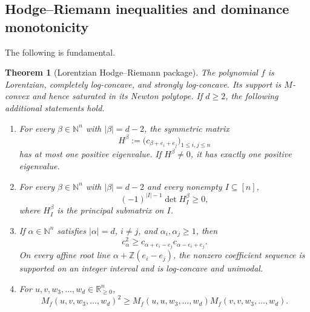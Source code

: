 \documentclass[11pt,a4paper,oneside]{amsart}
\numberwithin{equation}{section}
\newtheorem{theorem}{Theorem}[section]
\theoremstyle{definition}
\theoremstyle{remark}
\newcommand{\N}{\mathbb N}
\newcommand{\Z}{\mathbb Z}
\newcommand{\R}{\mathbb R}
\newcommand{\abs}[1]{\lvert#1\rvert}
\begin{document}
\subsection{Hodge--Riemann inequalities and dominance monotonicity}

The following is fundamental.

\begin{theorem}[Lorentzian Hodge--Riemann package]\label{thm:master-HR}
The polynomial $f$ is Lorentzian, completely log-concave, and strongly log-concave.  Its support is $M$-convex and hence saturated in its Newton polytope.  If $d\geq2$, the following additional statements hold.
\begin{enumerate}[label=\textup{(\roman*)}]
\item For every $\beta\in\N^n$ with $\abs\beta=d-2$, the symmetric matrix
\begin{equation}\label{eq:H-beta}
 H^\beta:=\bigl(c_{\beta+e_i+e_j}\bigr)_{1\leq i,j\leq n}
\end{equation}
has at most one positive eigenvalue.  If $H^\beta\neq0$, it has exactly one positive eigenvalue.
\item For every $\beta\in\N^n$ with $\abs\beta=d-2$ and every nonempty $I\subseteq[n]$,
\begin{equation}\label{eq:principal-sign}
 (-1)^{\abs I-1}\det H_I^\beta\geq0,
\end{equation}
where $H_I^\beta$ is the principal submatrix on $I$.
\item If $\alpha\in\N^n$ satisfies $\abs\alpha=d$, $i\neq j$, and $\alpha_i,\alpha_j\geq1$, then
\begin{equation}\label{eq:root-logconcavity}
 c_\alpha^2\geq
 c_{\alpha+e_i-e_j}c_{\alpha-e_i+e_j}.
\end{equation}
On every affine root line $\alpha+\Z(e_i-e_j)$, the nonzero coefficient sequence is supported on an integer interval and is log-concave and unimodal.
\item For $u,v,w_3,\ldots,w_d\in\R_{\geq0}^n$,
\begin{equation}\label{eq:AF-master}
 M_f(u,v,w_3,\ldots,w_d)^2
 \geq
 M_f(u,u,w_3,\ldots,w_d)
 M_f(v,v,w_3,\ldots,w_d).
\end{equation}
\end{enumerate}
\end{theorem}
\end{document}
